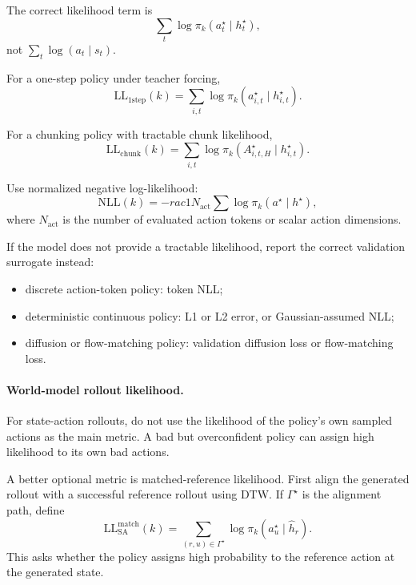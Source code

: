 \documentclass[11pt]{article}
\begin{document}
The correct likelihood term is
\begin{equation}
\sum_t \log \pi_k(a_t^{\star}\mid h_t^{\star}),
\end{equation}
not $\sum_t \log(a_t\mid s_t)$.

For a one-step policy under teacher forcing,
\begin{equation}
\mathrm{LL}_{\mathrm{1step}}(k)
=
\sum_{i,t}
\log \pi_k(a^{\star}_{i,t}\mid h^{\star}_{i,t}).
\end{equation}

For a chunking policy with tractable chunk likelihood,
\begin{equation}
\mathrm{LL}_{\mathrm{chunk}}(k)
=
\sum_{i,t}
\log \pi_k(A^{\star}_{i,t,H}\mid h^{\star}_{i,t}).
\end{equation}

Use normalized negative log-likelihood:
\begin{equation}
\mathrm{NLL}(k)
=
-rac{1}{N_{\mathrm{act}}}
\sum \log \pi_k(a^{\star}\mid h^{\star}),
\end{equation}
where $N_{\mathrm{act}}$ is the number of evaluated action tokens or scalar action dimensions.

If the model does not provide a tractable likelihood, report the correct validation surrogate instead:
\begin{itemize}
    \item discrete action-token policy: token NLL;
    \item deterministic continuous policy: L1 or L2 error, or Gaussian-assumed NLL;
    \item diffusion or flow-matching policy: validation diffusion loss or flow-matching loss.
\end{itemize}

\paragraph{World-model rollout likelihood.}
For state-action rollouts, do not use the likelihood of the policy's own sampled actions as the main metric. A bad but overconfident policy can assign high likelihood to its own bad actions.

A better optional metric is matched-reference likelihood. First align the generated rollout with a successful reference rollout using DTW. If $\Gamma^{\star}$ is the alignment path, define
\begin{equation}
\mathrm{LL}^{\mathrm{match}}_{\mathrm{SA}}(k)
=
\sum_{(r,u)\in\Gamma^{\star}}
\log \pi_k(a^{\star}_{u}\mid \hat{h}_{r}).
\end{equation}
This asks whether the policy assigns high probability to the reference action at the generated state.
\end{document}
